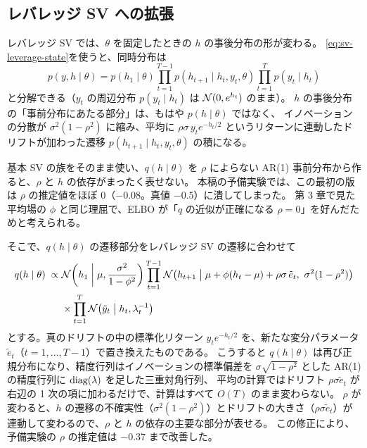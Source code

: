 \subsection{レバレッジ SV への拡張}\label{sec:fam-leverage}

レバレッジ SV では、$\theta$ を固定したときの $h$ の事後分布の形が変わる。
\cref{eq:sv-leverage-state}を使うと、同時分布は
\[
  p(y, h \mid \theta) = p(h_1 \mid \theta) \prod_{t=1}^{T-1} p(h_{t+1} \mid h_t, y_t, \theta) \prod_{t=1}^{T} p(y_t \mid h_t)
\]
と分解できる（$y_t$ の周辺分布 $p(y_t \mid h_t)$ は $\mathcal{N}(0, e^{h_t})$ のまま）。
$h$ の事後分布の「事前分布にあたる部分」は、もはや $p(h \mid \theta)$ ではなく、
イノベーションの分散が $\sigma^2(1 - \rho^2)$ に縮み、平均に $\rho\sigma\, y_t e^{-h_t/2}$ というリターンに連動したドリフトが加わった遷移 $p(h_{t+1} \mid h_t, y_t, \theta)$ の積になる。

基本 SV の族をそのまま使い、$q(h \mid \theta)$ を $\rho$ によらない AR(1) 事前分布から作ると、$\rho$ と $h$ の依存がまったく表せない。
本稿の予備実験では、この最初の版は $\rho$ の推定値をほぼ 0（$-0.08$。真値 $-0.5$）に潰してしまった。
第 3 章で見た平均場の $\phi$ と同じ理屈で、ELBO が「$q$ の近似が正確になる $\rho = 0$」を好んだためと考えられる。

そこで、$q(h \mid \theta)$ の遷移部分をレバレッジ SV の遷移に合わせて
\begin{equation}
  \begin{aligned}
  q(h \mid \theta) \;\propto\;& \mathcal{N}\!\left(h_1 \;\middle|\; \mu, \frac{\sigma^2}{1-\phi^2}\right)
    \prod_{t=1}^{T-1} \mathcal{N}\!\left(h_{t+1} \;\middle|\; \mu + \phi(h_t - \mu) + \rho\sigma\,\tilde e_t,\ \sigma^2(1 - \rho^2)\right) \\
    &\times \prod_{t=1}^{T} \mathcal{N}\!\left(\tilde y_t \;\middle|\; h_t, \lambda_t^{-1}\right)
  \end{aligned}
  \label{eq:fam-leverage}
\end{equation}
とする。真のドリフトの中の標準化リターン $y_t e^{-h_t/2}$ を、新たな変分パラメータ $\tilde e_t$（$t = 1, \dots, T-1$）で置き換えたものである。
こうすると $q(h \mid \theta)$ は再び正規分布になり、精度行列はイノベーションの標準偏差を $\sigma\sqrt{1 - \rho^2}$ とした AR(1) の精度行列に $\mathrm{diag}(\lambda)$ を足した三重対角行列、
平均の計算ではドリフト $\rho\sigma\tilde e_t$ が右辺の 1 次の項に加わるだけで、計算はすべて $O(T)$ のまま変わらない。
$\rho$ が変わると、$h$ の遷移の不確実性（$\sigma^2(1 - \rho^2)$）とドリフトの大きさ（$\rho\sigma\tilde e_t$）が連動して変わるので、$\rho$ と $h$ の依存の主要な部分が表せる。
この修正により、予備実験の $\rho$ の推定値は $-0.37$ まで改善した。

